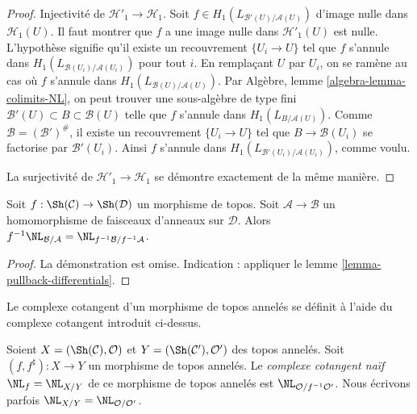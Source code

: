 \begin{proof}
\medskip\noindent
Injectivité de $\mathcal{H}'_1 \to \mathcal{H}_1$. Soit
$f \in H_1(L_{\mathcal{B}'(U)/\mathcal{A}(U)})$ d'image nulle dans
$\mathcal{H}_1(U)$. Il faut montrer que $f$ a une image nulle dans
$\mathcal{H}'_1(U)$ est nulle. L'hypothèse signifie qu'il existe un recouvrement
$\{U_i \to U\}$ tel que $f$ s'annule dans
$H_1(L_{\mathcal{B}(U_i)/\mathcal{A}(U_i)})$ pour tout $i$.
En remplaçant $U$ par $U_i$, on se ramène au cas où $f$ s'annule dans
$H_1(L_{\mathcal{B}(U)/\mathcal{A}(U)})$.
Par Algèbre, lemme \ref{algebra-lemma-colimits-NL}, on peut trouver une
sous-algèbre de type fini $\mathcal{B}'(U) \subset B \subset \mathcal{B}(U)$
telle que $f$ s'annule dans $H_1(L_{B/\mathcal{A}(U)})$.
Comme $\mathcal{B} = (\mathcal{B}')^\#$, il existe un recouvrement
$\{U_i \to U\}$ tel que $B \to \mathcal{B}(U_i)$ se factorise par
$\mathcal{B}'(U_i)$. Ainsi $f$ s'annule dans
$H_1(L_{\mathcal{B}'(U_i)/\mathcal{A}(U_i)})$, comme voulu.

\medskip\noindent
La surjectivité de $\mathcal{H}'_1 \to \mathcal{H}_1$ se démontre
exactement de la même manière.
\end{proof}

\begin{lemma}
\label{lemma-pullback-NL}
Soit $f : \Sh(\mathcal{C}) \to \Sh(\mathcal{D})$ un morphisme de topos.
Soit $\mathcal{A} \to \mathcal{B}$ un homomorphisme de faisceaux d'anneaux
sur $\mathcal{D}$. Alors $f^{-1}\NL_{\mathcal{B}/\mathcal{A}} =
\NL_{f^{-1}\mathcal{B}/f^{-1}\mathcal{A}}$.
\end{lemma}

\begin{proof}
La démonstration est omise. Indication : appliquer le
lemme \ref{lemma-pullback-differentials}.
\end{proof}

\noindent
Le complexe cotangent d'un morphisme de topos annelés se définit à l'aide du
complexe cotangent introduit ci-dessus.

\begin{definition}
\label{definition-cotangent-complex-morphism-ringed-topoi}
Soient $X = (\Sh(\mathcal{C}), \mathcal{O})$ et
$Y = (\Sh(\mathcal{C}'), \mathcal{O}')$ des topos annelés.
Soit $(f, f^\sharp) : X \to Y$ un morphisme de topos annelés.
Le {\it complexe cotangent naïf} $\NL_f = \NL_{X/Y}$ de ce morphisme de
topos annelés est $\NL_{\mathcal{O}/f^{-1}\mathcal{O}'}$.
Nous écrivons parfois $\NL_{X/Y} = \NL_{\mathcal{O}/\mathcal{O}'}$.
\end{definition}









